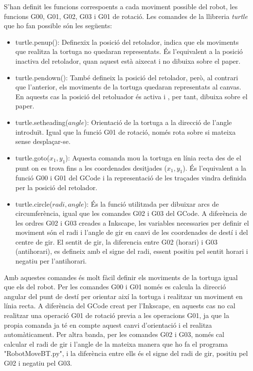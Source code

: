 S'han definit les funcions correspoents a cada moviment possible del robot, les funcions G00, G01, G02, G03 i G01 de rotació. Les comandes de la llibreria \emph{turtle} que ho fan possible són les següents:
\begin{itemize}
	\item turtle.penup(): Definexix la posició del retolador, indica que els moviments que realitza la tortuga no quedaran representats. És l'equivalent a la posició inactiva del retolador, quan aquest està aixecat i no dibuixa sobre el paper.
	\item turtle.pendown(): També defineix la posició del retolador, però, al contrari que l'anterior, els moviments de la tortuga quedaran representats al canvas. En aquests cas la posició del retoluador és activa i , per tant, dibuixa sobre el paper.
	\item turtle.setheading($angle$): Orientació de la tortuga a la direcció de l'angle introduït. Igual que la funció G01 de rotació, només rota sobre si mateixa sense desplaçar-se. 
	\item turtle.goto($x_{1},y_{1}$): Aquesta comanda mou la tortuga en línia recta des de el punt on es trova fins a les coordenades desitjades ($x_{1},y_{1}$). És l'equivalent a la funció G00 i G01 del GCode i la representació de les traçades vindra definida per la posició del retolador.
	\item turtle.circle($radi,angle$): És la funció utilitzada per dibuixar arcs de circumferència, igual que les comandes G02 i G03 del GCode. A diferència de les ordres G02 i G03 creades a Inkscape, les variables necessaries per definir el moviment són el radi i l'angle de gir en canvi de les coordenades de destí i del centre de gir. El sentit de gir, la diferencia entre G02 (horari) i G03 (antihorari), es defineix amb el signe del radi, essent positiu pel sentit horari i negatiu per l'antihorari. 
\end{itemize}

Amb aquestes comandes és molt fàcil definir els moviments de la tortuga igual que els del robot. Per les comandes G00 i G01 només es calcula la direcció angular del punt de destí per orientar així la tortuga i realitzar un moviment en línia recta. A diferència del GCode creat per l'Inkscape, en aquests cas no cal realitzar una operació G01 de rotació previa a les operacions G01, ja que la propia comanda ja té en compte aquest canvi d'orientació i el realitza automàticament. Per altra banda, per les comandes G02 i G03, només cal calcular el radi de gir i l'angle de la mateixa manera que ho fa el programa "RobotMoveBT.py", i la diferència entre ells és el signe del radi de gir, positiu pel G02 i negatiu pel G03. 

